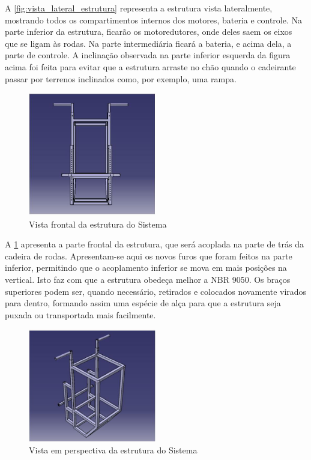 A \ref{fig:vista_lateral_estrutura} representa a estrutura vista lateralmente, mostrando todos os compartimentos internos dos motores, bateria e controle. Na parte inferior da estrutura, ficarão os motoredutores, onde deles saem os eixos que se ligam às rodas. Na parte intermediária ficará a bateria, e acima dela, a parte de controle. A inclinação observada na parte inferior esquerda da figura acima foi feita para evitar que a estrutura arraste no chão quando o cadeirante passar por terrenos inclinados como, por exemplo, uma rampa.

\begin{figure}[!htb]
\centering
\includegraphics[width=0.5\textwidth]{figuras/resultados/vista_frontal_estrutura}
\caption{Vista frontal da estrutura do Sistema}
\label{fig:vista_frontal_estrutura}
\end{figure}


A \ref{fig:vista_frontal_estrutura} apresenta a parte frontal da estrutura, que será acoplada na parte de trás da cadeira de rodas. Apresentam-se aqui os novos furos que foram feitos na parte inferior, permitindo que o acoplamento inferior se mova em mais posições na vertical. Isto faz com que a estrutura obedeça melhor a NBR 9050. Os braços superiores podem ser, quando necessário, retirados e colocados novamente virados para dentro, formando assim uma espécie de alça para que a estrutura seja puxada ou transportada mais facilmente.

\begin{figure}[!htb]
\centering
\includegraphics[width=0.5\textwidth]{figuras/resultados/vista_perspectiva_estrutura}
\caption{Vista em perspectiva da estrutura do Sistema}
\label{fig:vista_perspectiva_estrutura}
\end{figure}

